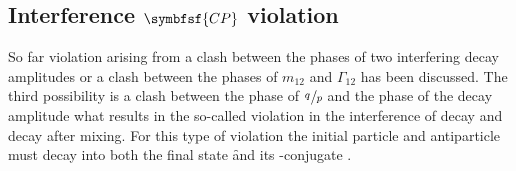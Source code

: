 \subsection[head={Interference \CP violation},tocentry={Interference \CP violation}]{Interference $\symbfsf{C{}P}$ violation}
\label{sec:InterferenceCPV}

So far \CP violation arising from a clash between the phases of two interfering decay amplitudes or a clash between the phases of $m_{12}$ and $\Gamma_{12}$ has been discussed.
The third possibility is a clash between the phase of $\nicefrac{q\,}{p}$ and the phase of the decay amplitude what results in the so-called \CP violation in the interference of decay and decay after mixing.
For this type of \CP violation the initial particle \Paz and antiparticle \Pazb must decay into both the final state \f and its \CP-conjugate \fbar.

